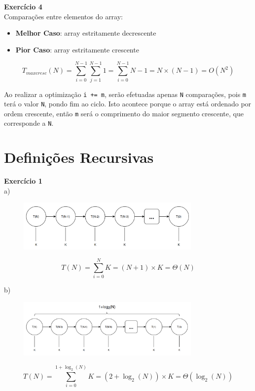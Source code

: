 \documentclass[a4paper,11pt]{article}
\begin{document}
	
	\noindent \textbf{Exercício 4}\\
	
	\noindent Comparações entre elementos do array:
	
	\begin{itemize}
		\item \textbf{Melhor Caso}: array estritamente decrescente
		\item \textbf{Pior Caso}: array estritamente crescente
	\end{itemize}
	\[
		T_{maxcresc}(N) = \sum_{i=0}^{N-1} \sum_{j=1}^{N-1} 1 = \sum_{i=0}^{N-1} N - 1 = N \times (N-1) = O(N^2)
	\]
	
	\noindent Ao realizar a optimização \texttt{i += m}, serão efetuadas apenas \texttt{N} comparações, pois \texttt{m} terá o valor \texttt{N}, pondo fim ao ciclo. Isto acontece porque o array está ordenado por ordem crescente, então \texttt{m} será o comprimento do maior segmento crescente, que corresponde a \texttt{N}.
	
	
	\section{Definições Recursivas}
	
	\noindent \textbf{Exercício 1}\\
	
	\noindent a)
	
	\begin{figure}[h]
		\centering
		\includegraphics[width=0.8\textwidth]{imgs/2_1-a.png}
	\end{figure}
	\[
		T(N) = \sum_{i=0}^{N} K = (N + 1) \times K = \Theta(N)
	\]
	
	\noindent b)
	
	\begin{figure}[h]
		\centering
		\includegraphics[width=0.8\textwidth]{imgs/2_1-b.png}
	\end{figure}
	\[
		T(N) = \sum_{i=0}^{1 + \log_2(N)} K = (2 + \log_2(N)) \times K = \Theta(\log_2(N))
	\]
	
\end{document}
